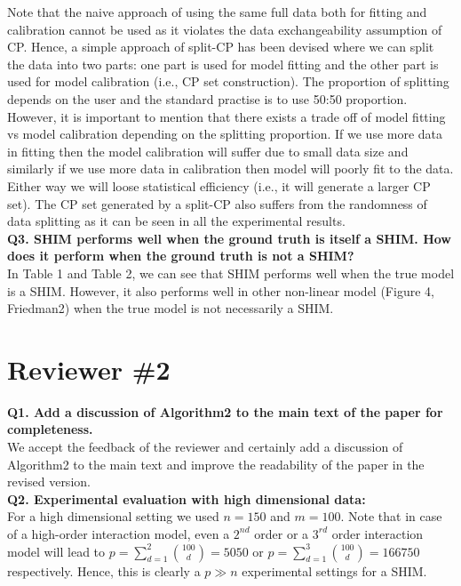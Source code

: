\documentclass{article}
\begin{document}
Note that the naive approach of using the same full data both for fitting and calibration cannot be used as it violates the data exchangeability assumption of CP. Hence, a simple approach of split-CP has been devised where we can split the data into two parts: one part is used for model fitting and the other part is used for model calibration (i.e., CP set construction). The proportion of splitting depends on the user and the standard practise is to use 50:50 proportion. However, it is important to mention that there exists a trade off of model fitting vs model calibration depending on the splitting proportion. If we use more data in fitting then the model calibration will suffer due to small data size and similarly if we use more data in calibration then model will poorly fit to the data. Either way we will loose statistical efficiency (i.e., it will generate a larger CP set). The CP set generated by a split-CP also suffers from the randomness of data splitting as it can be seen in all the experimental results.\\ 


\textbf{Q3. SHIM performs well when the ground truth is itself a SHIM. How does it perform when the ground truth is not a SHIM?}\\

In Table 1 and Table 2, we can see that SHIM performs well when the true model is a SHIM. However, it also performs well in other non-linear model (Figure 4, Friedman2) when the true model is not necessarily a SHIM.\\



\section*{Reviewer \#2}
\textbf{Q1. Add a discussion of Algorithm2 to the main text of the paper for completeness.}\\

We accept the feedback of the reviewer and certainly add a discussion of Algorithm2 to the main text and improve the readability of the paper in the revised version.\\

\textbf{Q2. Experimental evaluation with high dimensional data:}\\

For a high dimensional setting we used $n=150$ and $m=100$. Note that in case of a high-order interaction model, even a $2^{nd}$ order or a $3^{rd}$ order interaction model will lead to $p=\sum_{d=1}^2 \binom{100}{d}=5050$ or  $p=\sum_{d=1}^3 \binom{100}{d}=166750$ respectively. Hence, this is clearly a $p\gg n$ experimental settings for a SHIM.\\
\end{document}
